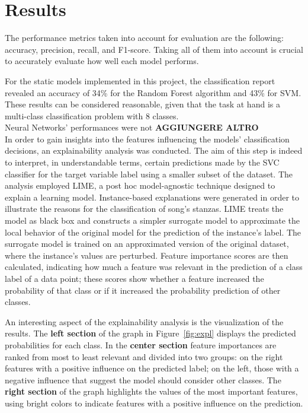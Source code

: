 \chapter*{Results}
\label{ch:results}
The performance metrics taken into account for evaluation are the following:
accuracy, precision, recall, and F1-score. Taking all of them into account
is crucial to accurately evaluate how well each model performs.

For the static models implemented in this project, the classification report
revealed an accuracy of 34\% for the Random Forest algorithm and 43\% for SVM. 
These results can be considered reasonable, given that the task at hand is a
multi-class classification problem with 8 classes.\\

Neural Networks' performances were not \textbf{AGGIUNGERE ALTRO}\\

In order to gain insights into the features influencing the models' classification decisions, an explainability analysis was conducted.
The aim of this step is indeed to interpret, in understandable terms, certain predictions made by the SVC classifier for the target variable label using a smaller subset of the dataset. 
The analysis employed LIME, a post hoc model-agnostic technique designed to explain a learning model. Instance-based explanations were generated in order to illustrate the reasons for the classification of song's stanzas.
LIME treats the model as black box and constructs a simpler surrogate model to approximate the local behavior of the original model for the prediction of the instance's label. 
The surrogate model is trained on an approximated version of the original dataset, where the instance's values are perturbed. Feature importance scores are then calculated, 
indicating how much a feature was relevant in the prediction of a class label of a data point; these scores show whether a feature increased the probability of that class or if it increased the probability prediction of other classes.

An interesting aspect of the explainability analysis is the visualization of the results.
The \textbf{left section} of the graph in Figure~\ref{fig:expl} displays the predicted probabilities for each class. In the \textbf{center section}
feature importances are ranked from most to least relevant and divided into two groups: on the right
features with a positive influence on the predicted label; on the left, those with a negative influence that suggest the model should consider other classes.
The \textbf{right section} of the graph highlights the values of the most important
features, using bright colors to indicate features with a positive influence on the prediction.

